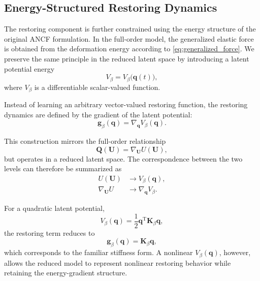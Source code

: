 \documentclass[journal,twoside]{IEEEtran}
\begin{document}
\subsection{Energy-Structured Restoring Dynamics}
\label{subsec:energy}

The restoring component is further constrained using the energy structure of
the original ANCF formulation. In the full-order model, the generalized
elastic force is obtained from the deformation energy according to
\eqref{eq:generalized_force}. We preserve the same principle in the reduced
latent space by introducing a latent potential energy
\begin{equation}
    V_{\beta}
    =
    V_{\beta}\big(\mathbf{q}(t)\big),
    \label{eq:latent_potential}
\end{equation}
where $V_{\beta}$ is a differentiable scalar-valued function.

Instead of learning an arbitrary vector-valued restoring function, the
restoring dynamics are defined by the gradient of the latent potential:
\begin{equation}
    \mathbf{g}_{\beta}(\mathbf{q})
    =
    \nabla_{\mathbf{q}}
    V_{\beta}(\mathbf{q}).
    \label{eq:potential_gradient}
\end{equation}

This construction mirrors the full-order relationship
\begin{equation}
    \mathbf{Q}(\mathbf{U})
    =
    \nabla_{\mathbf{U}}
    U(\mathbf{U}),
    \label{eq:full_energy_relation}
\end{equation}
but operates in a reduced latent space. The correspondence between the two
levels can therefore be summarized as
\begin{equation}
\begin{aligned}
    U(\mathbf{U})
        &\longrightarrow V_{\beta}(\mathbf{q}),\\
    \nabla_{\mathbf{U}}U
        &\longrightarrow
        \nabla_{\mathbf{q}}V_{\beta}.
\end{aligned}
\label{eq:energy_correspondence}
\end{equation}

For a quadratic latent potential,
\begin{equation}
    V_{\beta}(\mathbf{q})
    =
    \frac{1}{2}
    \mathbf{q}^{\mathrm T}
    \mathbf{K}_{\beta}
    \mathbf{q},
    \label{eq:quadratic_potential}
\end{equation}
the restoring term reduces to
\begin{equation}
    \mathbf{g}_{\beta}(\mathbf{q})
    =
    \mathbf{K}_{\beta}\mathbf{q},
    \label{eq:linear_restoring}
\end{equation}
which corresponds to the familiar stiffness form. A nonlinear
$V_{\beta}(\mathbf{q})$, however, allows the reduced model to represent
nonlinear restoring behavior while retaining the energy-gradient structure.
\end{document}
